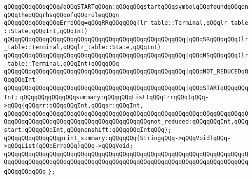 \verb|qQQqqQQqqQQqqQQq#qQQqSTARTqQQqn:qQQqqQQqstartqQQqsymbolqQQqfoundqQQqonqQQqtheqQQqrhsqQQqofqQQqruleqQQqn|\newline
\newline
\verb|qQQqqQQqqQQqqQQqErrqQQq=qQQqRRqQQqqQQq(lr_table::Terminal,qQQqlr_table::State,qQQqInt,qQQqInt)|\newline
\verb|qQQqqQQqqQQqqQQqqQQqqQQqqQQqqQQqqQQqqQQqqQQqqQQqqQQq|\verb#|qQQqSRqQQqqQQq(lr_table::Terminal,qQQqlr_table::State,qQQqInt)#\newline
\verb|qQQqqQQqqQQqqQQqqQQqqQQqqQQqqQQqqQQqqQQqqQQqqQQqqQQq|\verb#|qQQqNSqQQqqQQq(lr_table::Terminal,qQQqInt)qQQqqQQq#\newline
\verb|qQQqqQQqqQQqqQQqqQQqqQQqqQQqqQQqqQQqqQQqqQQqqQQqqQQq|\verb#|qQQqNOT_REDUCEDqQQqqQQqInt#\newline
\verb|qQQqqQQqqQQqqQQqqQQqqQQqqQQqqQQqqQQqqQQqqQQqqQQqqQQq|\verb#|qQQqSTARTqQQqqQQqInt;#\newline
\newline
\verb|qQQqqQQqqQQqqQQqsummary:qQQqqQQqList(qQQqErrqQQq)qQQq->qQQq{qQQqrr:qQQqqQQqInt,qQQqsr:qQQqInt,|\newline
\verb|qQQqqQQqqQQqqQQqqQQqqQQqqQQqqQQqqQQqqQQqqQQqqQQqqQQqqQQqqQQqqQQqqQQqqQQqqQQqqQQqqQQqqQQqqQQqqQQqqQQqqQQqqQQqqQQqnot_reduced:qQQqqQQqInt,qQQqstart:qQQqqQQqInt,qQQqnonshift:qQQqqQQqIntqQQq};|\newline
\newline
\verb|qQQqqQQqqQQqqQQqprint_summary:qQQqqQQq(StringqQQq->qQQqVoid)qQQq->qQQqList(qQQqErrqQQq)qQQq->qQQqVoid;|\newline
\verb|qQQqqQQqqQQqqQQqqQQqqQQqqQQqqQQqqQQqqQQqqQQqqQQqqQQqqQQqqQQqqQQqqQQqqQQqqQQqqQQqqQQqqQQqqQQqqQQqqQQqqQQqqQQqqQQqqQQqqQQqqQQqqQQqqQQqqQQqqQQqqQQqqQQqqQQq|\newline
\verb|};|\newline
\newline

